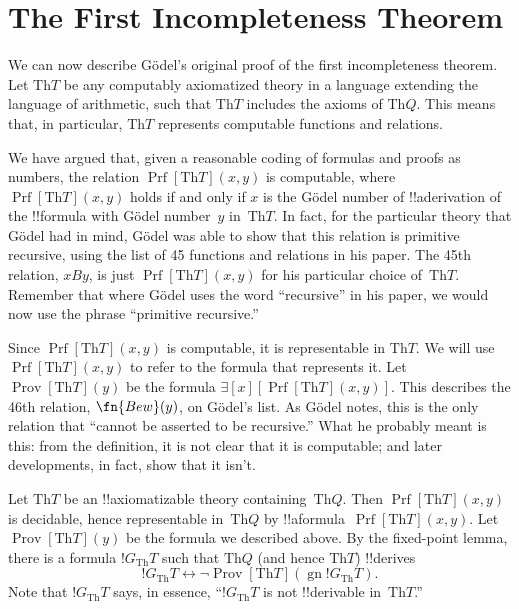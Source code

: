 \documentclass[10pt,a4paper]{article}
\theoremstyle{plain}
\theoremstyle{definition}
\theoremstyle{remark}
\newcommand*{\olfileid}[3]{}
\newcommand*{\olsection}[1]{\section*{#1}}
\newcommand*{\ollabel}[1]{\label{#1}}
\providecommand{\lexists}{\mathord{\exists}}
\providecommand{\Th}{\ensuremath{\mathrm{Th}}}
\providecommand{\Prf}{\operatorname{Prf}}
\providecommand{\gn}{\operatorname{gn}}
\providecommand{\liff}{\mathbin{\leftrightarrow}}
\providecommand{\OProv}{\operatorname{Prov}}
\providecommand{\OPrf}{\operatorname{Prf}}
\begin{document}



\olfileid{inc}{inp}{1in}

\olsection{The First Incompleteness Theorem}

We can now describe G\"odel's original proof of the first
incompleteness theorem. Let $\Th{T}$ be any computably axiomatized theory
in a language extending the language of arithmetic, such that $\Th{T}$
includes the axioms of $\Th{Q}$. This means that, in particular, $\Th{T}$
represents computable functions and relations.

We have argued that, given a reasonable coding of formulas and proofs
as numbers, the relation $\Prf[\Th{T}](x,y)$ is computable, where
$\Prf[\Th{T}](x,y)$ holds if and only if $x$ is the G\"odel number of
!!a{derivation} of the !!{formula} with G\"odel number~$y$
in~$\Th{T}$. In fact, for the particular theory that G\"odel had in
mind, G\"odel was able to show that this relation is primitive
recursive, using the list of 45 functions and relations in his
paper. The 45th relation, $x B y$, is just $\Prf[\Th{T}](x,y)$ for his
particular choice of~$\Th{T}$. Remember that where G\"odel uses the
word ``recursive'' in his paper, we would now use the phrase
``primitive recursive.''

Since $\Prf[\Th{T}](x,y)$ is computable, it is representable in $\Th{T}$. We
will use $\OPrf[\Th{T}](x,y)$ to refer to the formula that represents
it. Let $\OProv[\Th{T}](y)$ be the formula
$\lexists[x][\OPrf[\Th{T}](x,y)]$. This describes the 46th relation,
$\fn{Bew}(y)$, on G\"odel's list. As G\"odel notes, this is the only
relation that ``cannot be asserted to be recursive.''  What he
probably meant is this: from the definition, it is not clear that it
is computable; and later developments, in fact, show that it isn't.

Let $\Th{T}$ be an !!{axiomatizable} theory containing~$\Th{Q}$. Then
$\Prf[\Th{T}](x, y)$ is decidable, hence representable in~$\Th{Q}$ by
!!a{formula}~$\OPrf[\Th{T}](x, y)$. Let $\OProv[\Th{T}](y)$ be the formula we
described above. By the fixed-point lemma, there is a formula
$!G_\Th{T}$ such that $\Th{Q}$ (and hence $\Th{T}$) !!{derive}s
\begin{equation}
\ollabel{eqn:qpf}
!G_\Th{T} \liff \lnot \OProv[\Th{T}](\gn{!G_\Th{T}}).
\end{equation}
Note that $!G_\Th{T}$ says, in essence, ``$!G_\Th{T}$ is not
!!{derivable} in~$\Th{T}$.''
\end{document}
